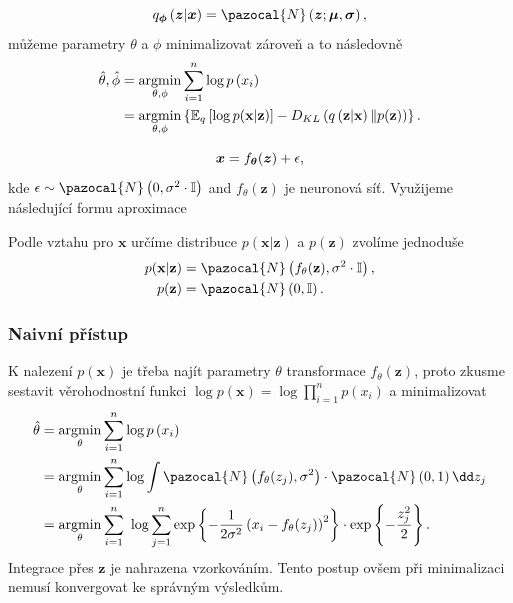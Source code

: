 \begin{equation}
q_{\bphi}\left(\boldsymbol{z}\vert \bx \right) = \pazocal{N}\left(\boldsymbol{z}; \boldsymbol{\mu},\boldsymbol{\sigma}  \right) ,
\end{equation}
můžeme parametry $\theta$ a $\phi$ minimalizovat zároveň a to následovně
\begin{equation}
\begin{split}
\hat{\theta},\hat{\phi} & = \mathop{\mathrm{argmin}}_{\theta, \phi}\sum_{i=1}^n\log p\left(x_i\right) \\
& = \mathop{\mathrm{argmin}}_{\theta, \phi}\left\lbrace  \mathbb{E}_q\left[\log p(\textbf{x}\vert \textbf{z}) \right] - D_{KL}\left(q\left(\textbf{z}\vert \textbf{x} \right) \Vert p(\textbf{z})\right)\right\rbrace . 
\end{split}
\end{equation}

\begin{equation}
\boldsymbol{x} = f_{\boldsymbol{\theta}}(\boldsymbol{z}) + \epsilon ,
\end{equation}
kde $\epsilon \sim \pazocal{N}\left(0,\sigma^2\cdot\mathbb{I}   \right)$ and  $f_{\theta}(\textbf{z})$ je neuronová síť.  Využijeme následující formu aproximace

Podle vztahu pro $\textbf{x}$ určíme distribuce $p\left(\textbf{x}\vert \textbf{z}\right)$ a $p\left(\textbf{z}\right)$ zvolíme jednoduše
\begin{equation}\label{VAE_latent}
\begin{split}
 p(\textbf{x}\vert \textbf{z}) &= \pazocal{N}\left(f_{\theta}(\textbf{z}),\sigma^2\cdot\mathbb{I} \right), \\
p(\textbf{z}) &= \pazocal{N}\left(0,\mathbb{I} \right).
\end{split}
\end{equation}

\subsubsection{Naivní přístup}
K nalezení $p(\textbf{x})$ je třeba najít parametry $\theta$ transformace $f_{\theta}(\textbf{z})$, proto zkusme sestavit věrohodnostní funkci $ \log p\left( \textbf{x}\right) = \log \prod_{i = 1}^n p\left(x_i \right) $  a minimalizovat 
\begin{equation}
\begin{split}
\hat{\theta} & = \argmin_{\theta} \sum_{i=1}^n \log p\left(x_{i} \right)\\
& =  \argmin_{\theta} \sum_{i=1}^n \log \int \pazocal{N}\left(f_{\theta}(z_j),\sigma^2 \right)\cdot\pazocal{N}\left(0,1 \right)    \dd z_j \\
& = \argmin_{\theta} \sum_{i=1}^n \ \log\sum_{j=1}^n \exp \left\lbrace -\frac{1}{2\sigma^2} \left(x_i - f_{\theta}(z_j)  \right)^2 \right\rbrace \cdot \exp \left\lbrace -\frac{z_j^2}{2} \right\rbrace .
\end{split}
\end{equation}
Integrace přes $\textbf{z}$ je nahrazena vzorkováním. Tento postup ovšem při minimalizaci nemusí konvergovat ke správným výsledkům.
